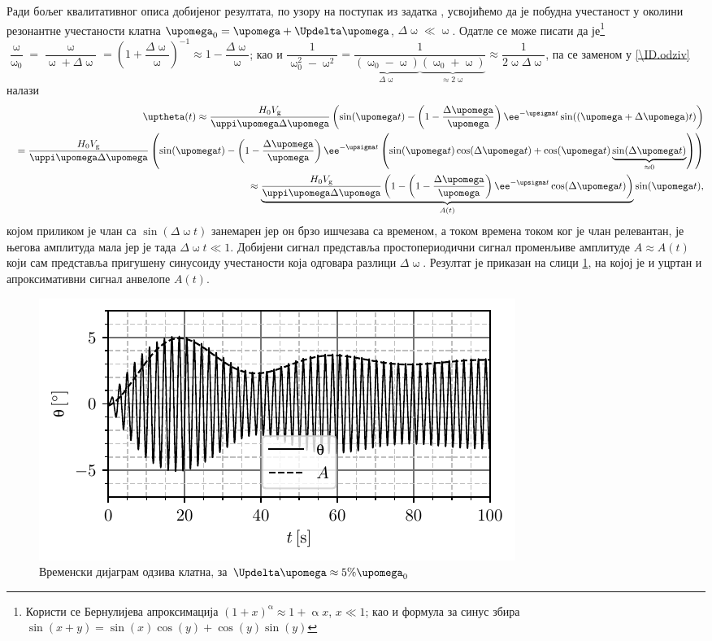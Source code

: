 Ради бољег квалитативног описа добијеног резултата, по узору на поступак из задатка , усвојићемо  
да је побудна учестаност у околини резонантне учестаности клатна 
$\upomega_0 = \upomega + \Updelta\upomega$, $\Delta \upomega \ll \upomega$. Одатле се може писати да је\footnote{
    Користи се Бернулијева апроксимација $(1+x)^\upalpha \approx 1 + \upalpha x$, $x \ll 1$; као и формула за синус збира
    $\sin(x+y) = \sin(x)\cos(y) + \cos(y)\sin(y)$
}
$
\dfrac{\upomega}{\upomega_0} = \dfrac{\upomega}{\upomega + \Delta \upomega} = \left(1 + \dfrac{\Delta \upomega}{\upomega} \right)^{-1} \approx 
1 - \dfrac{\Delta \upomega}{\upomega}$; као и 
$
\dfrac{1}{\upomega_0^2 - \upomega^2} = 
\dfrac{1}{\underbrace{(\upomega_0 - \upomega)}_{\Delta\upomega} \underbrace{(\upomega_0 + \upomega)}_{\approx 2\upomega} } \approx 
\dfrac{1}{2\upomega \Delta \upomega}
$, па се заменом у \eqref{\ID.odziv} налази 
\begin{eqnarray*}
    && \uptheta(t) \approx \dfrac{H_0 V_{\rm g}}{\uppi \upomega \Delta \upomega}
    \left(
        \sin(\upomega t )
        -
        \left(1 - \dfrac{\Delta \upomega}{\upomega}\right) \ee^{-\upsigma t} \sin( (\upomega + \Delta \upomega) t )
    \right) \\
    &&=
    \dfrac{H_0 V_{\rm g}}{\uppi \upomega \Delta \upomega}
    \left(
        \sin(\upomega t )
        -
        \left(1 - \dfrac{\Delta \upomega}{\upomega}\right) \ee^{-\upsigma t} 
        \left(
            \sin( \upomega t )  \cos(\Delta \upomega t ) + \cos( \upomega t )  \underbrace{\sin(\Delta \upomega t ) }_{\approx 0}
        \right)
    \right) \\ 
    && \approx
    \underbrace{\dfrac{H_0 V_{\rm g}}{\uppi \upomega \Delta \upomega}
        \left(
            1 - \left(1 - \dfrac{\Delta \upomega}{\upomega}\right) \ee^{-\upsigma t} \cos(\Delta \upomega t ) 
        \right)}_{A(t)} \sin(\upomega t),
\end{eqnarray*}
којом приликом је члан са $\sin(\Delta\upomega t)$ занемарен јер он брзо ишчезава са временом, а током времена током ког је члан релевантан, 
је његова амплитуда мала јер је тада $\Delta \upomega t \ll 1$. Добијени сигнал представља простопериодични сигнал променљиве амплитуде 
$A \approx A(t)$ 
који сам представља пригушену синусоиду учестаности која одговара разлици $\Delta \upomega$. Резултат је приказан на слици \ref{\ID.res}, 
на којој је и уцртан и апроксимативни сигнал анвелопе $A(t)$.

\begin{figure}[ht!]
    \centering
    \includegraphics{fig/klatno_plot.pdf}
    \caption{Временски дијаграм одзива клатна, за $\Updelta \upomega \approx 5\% \upomega_0$}
    \label{\ID.res}
\end{figure}